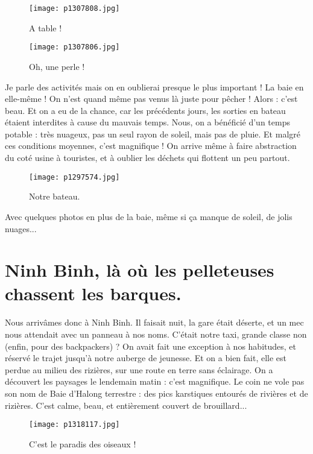 \documentclass{book}
\begin{document}
\begin{figure}[h]
\centering
\texttt{[image: p1307808.jpg]}
\caption*{A table !}
\end{figure}




\begin{figure}[h]
\centering
\texttt{[image: p1307806.jpg]}
\caption*{Oh, une perle !}
\end{figure}

Je parle des activités mais on en oublierai presque le plus important ! La baie en elle-même ! On n'est quand même pas venus là juste pour pêcher ! Alors : c'est beau. Et on a eu de la chance, car les précédents jours, les sorties en bateau étaient interdites à cause du mauvais temps. Nous, on a bénéficié d'un temps potable : très nuageux, pas un seul rayon de soleil, mais pas de pluie. Et malgré ces conditions moyennes, c'est magnifique ! On arrive même à faire abstraction du coté usine à touristes, et à oublier les déchets qui flottent un peu partout.


\begin{figure}[h]
\centering
\texttt{[image: p1297574.jpg]}
\caption*{Notre bateau.}
\end{figure}

 Avec quelques photos en plus de la baie, même si ça manque de soleil, de jolis nuages...

\chapter{Ninh Binh, là où les pelleteuses chassent les barques.}
Nous arrivâmes donc à Ninh Binh. Il faisait nuit, la gare était déserte, et un mec nous attendait avec un panneau à nos noms. C'était notre taxi, grande classe non (enfin, pour des backpackers) ? On avait fait une exception à nos habitudes, et réservé le trajet jusqu'à notre auberge de jeunesse. Et on a bien fait, elle est perdue au milieu des rizières, sur une route en terre sans éclairage. On a découvert les paysages le lendemain matin : c'est magnifique. Le coin ne vole pas son nom de Baie d'Halong terrestre : des pics karstiques entourés de rivières et de rizières. C'est calme, beau, et entièrement couvert de brouillard...


\begin{figure}[h]
\centering
\texttt{[image: p1318117.jpg]}
\caption*{C'est le paradis des oiseaux !}
\end{figure}
\end{document}

